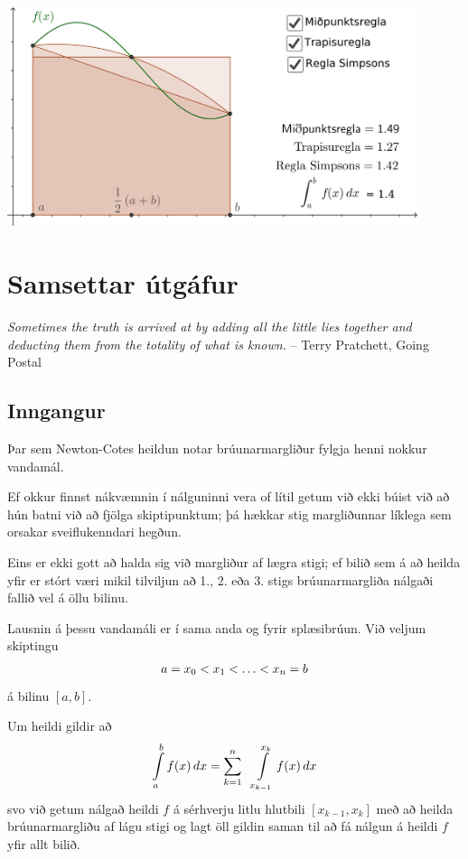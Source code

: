 \documentclass[letterpaper,10pt,icelandic]{sphinxmanual}
\begin{document}
\begin{center}
\includegraphics[width=12cm,keepaspectratio=true]{./heildun.png}
\end{center}



\section{Samsettar útgáfur}
\label{kafli05:index-5}\label{kafli05:samsettar-utgafur}
\emph{Sometimes the truth is arrived at by adding all the little lies together and
deducting them from the totality of what is known.}
-- Terry Pratchett, Going Postal


\subsection{Inngangur}
\label{kafli05:inngangur}
Þar sem Newton-Cotes heildun notar brúunarmargliður fylgja henni nokkur
vandamál.

Ef okkur finnst nákvæmnin í nálguninni vera of lítil getum við ekki
búist við að hún batni við að fjölga skiptipunktum; þá hækkar stig
margliðunnar líklega sem orsakar sveiflukenndari hegðun.

Eins er ekki gott að halda sig við margliður af lægra stigi; ef bilið
sem á að heilda yfir er stórt væri mikil tilviljun að 1., 2. eða 3.
stigs brúunarmargliða nálgaði fallið vel á öllu bilinu.

Lausnin á þessu vandamáli er í sama anda og fyrir splæsibrúun. Við
veljum skiptingu
\begin{gather}
\begin{split}a  =x_0 < x_1 < \ldots < x_n = b\end{split}\notag
\end{gather}
á bilinu \([a,b]\).

Um heildi gildir að
\begin{gather}
\begin{split}\int\limits_a^bf(x)\, dx = \sum\limits_{k=1}^n \ \ \int\limits_{x_{k-1}}^{x_k} f(x) \, dx\end{split}\notag
\end{gather}
svo við getum nálgað heildi \(f\) á sérhverju litlu hlutbili
\([x_{k-1},x_k]\) með að heilda brúunarmargliðu af lágu stigi og
lagt öll gildin saman til að fá nálgun á heildi \(f\) yfir allt
bilið.
\end{document}
